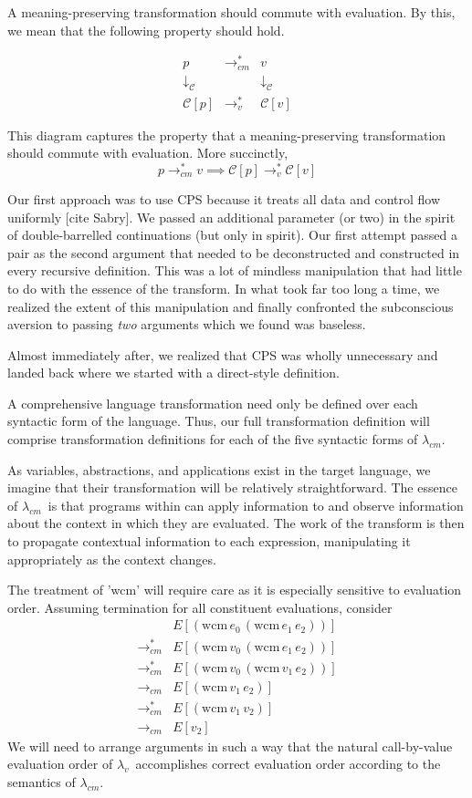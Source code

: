 \documentclass{llncs}
\newcommand{\cm}[0]{$\lambda_{cm}$}
\newcommand{\lv}[0]{$\lambda_v$}
\newcommand{\wcm}[2]{(\mathrm{wcm}\,#1\,#2)}
\newcommand{\lvrrs}[0]{\rightarrow_v^{*}}
\newcommand{\cmrr}[0]{\rightarrow_{cm}}
\newcommand{\cmrrs}[0]{\rightarrow_{cm}^{*}}
\newcommand{\C}[1]{\mathcal{C}[#1]}
\begin{document}
A meaning-preserving transformation should commute with evaluation. By this, we mean that the following property should hold.

\[
\begin{array}{ccc}
p & \cmrrs & v\\
\downarrow_\mathcal{C} & & \downarrow_\mathcal{C}\\
\C{p} & \lvrrs & \C{v}
\end{array}
\]

This diagram captures the property that a meaning-preserving transformation should commute with evaluation. More succinctly, 
\begin{equation}
\label{meaning-preservation-property}
p\cmrrs v\implies\C{p}\lvrrs\C{v}
\end{equation}

Our first approach was to use CPS because it treats all data and control flow uniformly [cite Sabry]. We passed an additional parameter (or two) in the spirit of double-barrelled continuations (but only in spirit). Our first attempt passed a pair as the second argument that needed to be deconstructed and constructed in every recursive definition. This was a lot of mindless manipulation that had little to do with the essence of the transform. In what took far too long a time, we realized the extent of this manipulation and finally confronted the subconscious aversion to passing \emph{two} arguments which we found was baseless.

Almost immediately after, we realized that CPS was wholly unnecessary and landed back where we started with a direct-style definition.


A comprehensive language transformation need only be defined over each syntactic form of the language. Thus, our full transformation definition will comprise transformation definitions for each of the five syntactic forms of \cm.

As variables, abstractions, and applications exist in the target language, we imagine that their transformation will be relatively straightforward. The essence of \cm\ is that programs within can apply information to and observe information about the context in which they are evaluated. The work of the transform is then to propagate contextual information to each expression, manipulating it appropriately as the context changes.

The treatment of \scheme'wcm' will require care as it is especially sensitive to evaluation order. Assuming termination for all constituent evaluations, consider
\begin{align*}
       &E[\wcm{e_0}{\wcm{e_1}{e_2}}]\\
\cmrrs &E[\wcm{v_0}{\wcm{e_1}{e_2}}]\\
\cmrrs &E[\wcm{v_0}{\wcm{v_1}{e_2}}]\\
\cmrr  &E[\wcm{v_1}{e_2}]\\
\cmrrs &E[\wcm{v_1}{v_2}]\\
\cmrr  &E[v_2]
\end{align*}
We will need to arrange arguments in such a way that the natural call-by-value evaluation order of \lv\ accomplishes correct evaluation order according to the semantics of \cm.
\end{document}
